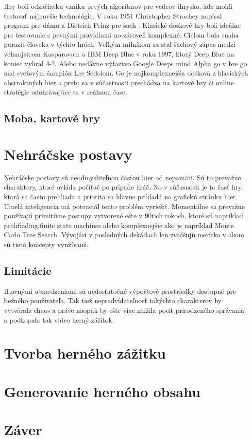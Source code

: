 \documentclass{article}
\begin{document}
Hry boli odzačiatku vzniku prvých algoritmov pre vedcov ihrysko, kde mohli testovať najnovšie technológie. V roku 1951 Christopher Strachey  napísal program pre dámu a Dietrich Prinz pre šach \cite{Copeland}. Klasické doskové hry boli ideálne pre testovanie s pevnými pravidlami no zároveň komplexné. Cielom bola snaha poraziť človeka v týchto hrách. Veľkým milníkom sa stal šachový zápas medzi veľmajstrom Kasparovom a IBM Deep Blue v roku 1997, ktorý Deep Blue na koniec vyhral 4-2. Alebo nedávne výťaztvo Google Deeps mind Alpha go v hre go nad svetovým šampión Lee Sedolom. Go je najkomplexnejšia dosková z klasických abstraktných hier a preto sa v súčastnosti prechádza na kartové hry či online stratégie odohrávajúce sa v reálnom čase.

\subsection{Moba, kartové hry}

\section{Nehráčske postavy}

Nehráčske postavy sú neodmysliteľnou časťou hier od nepamäti. Sú to prevažne charaktery, ktoré ovláda počítač po prípade hráč. No v súčasnosti je to časť hry, ktorá sa často prehliada a priorita sa hlavne prikladá na grafickú stránku hier. Umelá inteligencia má potenciál tento problém vyriešiť. Momentálne sa prevažne používajú primitívne postupy vytvorené ešte v 90tich rokoch, ktoré sú napríklad pathfinding,finite state machines alebo komplexnejšie ako je napríklad Monte Carlo Tree Search\cite{nickstatt}. Vývojári v posledných dekádach len zväčšujú merítko v akom sú tieto koncepty využívané.

\subsection{Limitácie}

Hlavnými obmedzeniami sú nedostatočné výpočtové prostriedky dostupné pre bežného používateľa. Tak tiež nepredvídateľnosť takýchto charakterov by vytvárala chaos a práve naopak by ešte viac znížila pocit prirodzeného správania a podkopala tak video herný zážitok\cite{phdthesis}.

\section{Tvorba herného zážitku}

\section{Generovanie herného obsahu}
\section{Záver}



\end{document}
